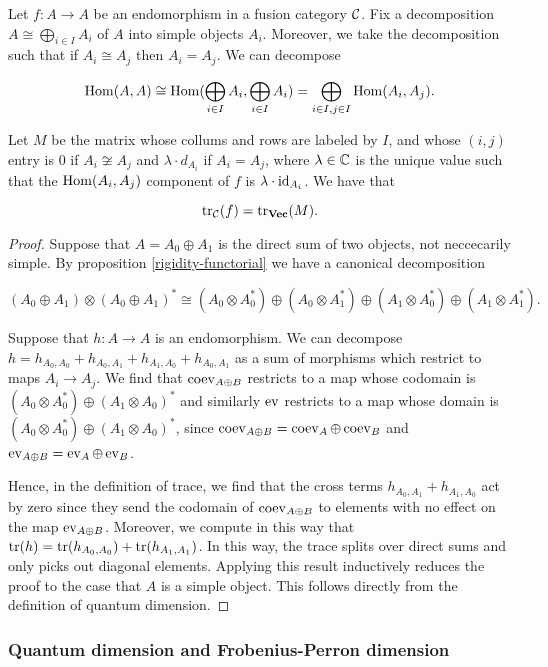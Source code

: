 \begin{cor}\label{trace-computation} Let $f:A\to A$ be an endomorphism in a fusion category ${\mathcal C}$. Fix a decomposition $A\cong \bigoplus_{i\in I}A_i$ of $A$ into simple objects $A_i$. Moreover, we take the decomposition such that if $A_i\cong A_j$ then $A_i=A_j$. We can decompose

$$\operatorname{Hom}(A,A)\cong \operatorname{Hom}(\bigoplus_{i\in I} A_i,\bigoplus_{i\in I}A_i)=\bigoplus_{i\in I, j\in I}\operatorname{Hom}(A_i,A_j).$$

Let $M$ be the matrix whose collums and rows are labeled by $I$, and whose $(i,j)$ entry is $0$ if $A_i\not\cong A_j$ and $\lambda \cdot d_{A_i}$ if $A_i=A_j$, where $\lambda\in {\mathbb C}$ is the unique value such that the $\operatorname{Hom}(A_i,A_j)$ component of $f$ is $\lambda\cdot \operatorname{id}_{A_i}$. We have that

$$\operatorname{tr}_{{\mathcal C}}(f)=\operatorname{tr}_{{\bf Vec}}(M).$$

\end{cor}
\begin{proof} Suppose that $A=A_0\oplus A_1$ is the direct sum of two objects, not neccecarily simple. By proposition \ref{rigidity-functorial} we have a canonical decomposition

$$(A_0\oplus A_1)\otimes (A_0\oplus A_1)^*\cong (A_0\otimes A_0^*) \oplus (A_0\otimes A_1^*) \oplus (A_1\otimes A_0^{*})\oplus (A_1\otimes A_1^*).$$

Suppose that $h:A\to A$ is an endomorphism. We can decompose $h=h_{A_0,A_0}+h_{A_0,A_1}+h_{A_1,A_0}+h_{A_0,A_1}$ as a sum of morphisms which restrict to maps $A_i\to A_j$. We find that $\operatorname{coev}_{A\oplus B}$ restricts to a map whose codomain is  $(A_0\otimes A_0^*) \oplus (A_1\otimes A_0)^*$ and similarly $\operatorname{ev}$ restricts to a map whose domain is $(A_0\otimes A_0^*) \oplus (A_1\otimes A_0)^*$, since $\operatorname{coev}_{A\oplus B}=\operatorname{coev}_{A}\oplus \operatorname{coev}_{B}$ and $\operatorname{ev}_{A\oplus B}=\operatorname{ev}_{A}\oplus \operatorname{ev}_{B}$.

Hence, in the definition of trace, we find that the cross terms $h_{A_0,A_1}+h_{A_1,A_0}$ act by zero since they send the codomain of $\operatorname{coev}_{A\oplus B}$ to elements with no effect on the map $\operatorname{ev}_{A\oplus B}$. Moreover, we compute in this way that $\operatorname{tr}(h)=\operatorname{tr}(h_{A_0,A_0})+\operatorname{tr}(h_{A_1,A_1})$. In this way, the trace splits over direct sums and only picks out diagonal elements. Applying this result inductively reduces the proof to the case that $A$ is a simple object. This follows directly from the definition of quantum dimension.
\end{proof}


\subsubsection{Quantum dimension and Frobenius-Perron dimension}

